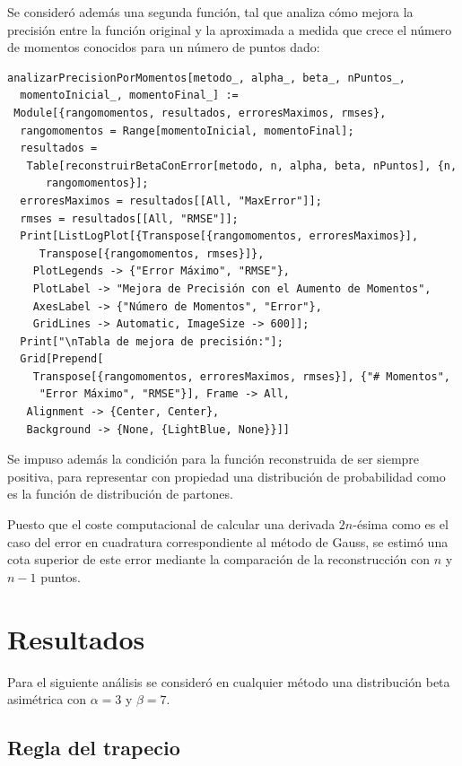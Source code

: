 \documentclass[titlepage,11pt]{report}
\begin{document}
Se consideró además una segunda función, tal que analiza cómo mejora la precisión entre la función original y la aproximada a medida que crece el número de momentos conocidos para un número de puntos dado:
\begin{lstlisting}
analizarPrecisionPorMomentos[metodo_, alpha_, beta_, nPuntos_, 
  momentoInicial_, momentoFinal_] := 
 Module[{rangomomentos, resultados, erroresMaximos, rmses}, 
  rangomomentos = Range[momentoInicial, momentoFinal];
  resultados = 
   Table[reconstruirBetaConError[metodo, n, alpha, beta, nPuntos], {n,
      rangomomentos}];
  erroresMaximos = resultados[[All, "MaxError"]];
  rmses = resultados[[All, "RMSE"]];
  Print[ListLogPlot[{Transpose[{rangomomentos, erroresMaximos}], 
     Transpose[{rangomomentos, rmses}]}, 
    PlotLegends -> {"Error Máximo", "RMSE"}, 
    PlotLabel -> "Mejora de Precisión con el Aumento de Momentos", 
    AxesLabel -> {"Número de Momentos", "Error"}, 
    GridLines -> Automatic, ImageSize -> 600]];
  Print["\nTabla de mejora de precisión:"];
  Grid[Prepend[
    Transpose[{rangomomentos, erroresMaximos, rmses}], {"# Momentos", 
     "Error Máximo", "RMSE"}], Frame -> All, 
   Alignment -> {Center, Center}, 
   Background -> {None, {LightBlue, None}}]]
\end{lstlisting}

Se impuso además la condición para la función reconstruida de ser siempre positiva, para representar con propiedad una distribución de probabilidad como es la función de distribución de partones.

Puesto que el coste computacional de calcular una derivada $2n$-ésima como es el caso del error en cuadratura correspondiente al método de Gauss, se estimó una cota superior de este error mediante la comparación de la reconstrucción con $n$ y $n-1$ puntos. 









\chapter{Resultados}
\label{sec:resultados}

Para el siguiente análisis se consideró en cualquier método una distribución beta asimétrica con $\alpha=3$ y $\beta=7$.

\section{Regla del trapecio}
\end{document}
